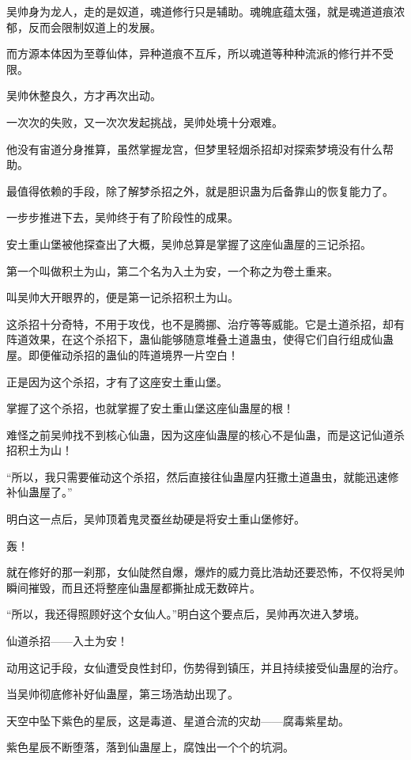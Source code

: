 \begin{this_body}
吴帅身为龙人，走的是奴道，魂道修行只是辅助。魂魄底蕴太强，就是魂道道痕浓郁，反而会限制奴道上的发展。

而方源本体因为至尊仙体，异种道痕不互斥，所以魂道等种种流派的修行并不受限。

吴帅休整良久，方才再次出动。

一次次的失败，又一次次发起挑战，吴帅处境十分艰难。

他没有宙道分身推算，虽然掌握龙宫，但梦里轻烟杀招却对探索梦境没有什么帮助。

最值得依赖的手段，除了解梦杀招之外，就是胆识蛊为后备靠山的恢复能力了。

一步步推进下去，吴帅终于有了阶段性的成果。

安土重山堡被他探查出了大概，吴帅总算是掌握了这座仙蛊屋的三记杀招。

第一个叫做积土为山，第二个名为入土为安，一个称之为卷土重来。

叫吴帅大开眼界的，便是第一记杀招积土为山。

这杀招十分奇特，不用于攻伐，也不是腾挪、治疗等等威能。它是土道杀招，却有阵道效果，在这个杀招下，蛊仙能够随意堆叠土道蛊虫，使得它们自行组成仙蛊屋。即便催动杀招的蛊仙的阵道境界一片空白！

正是因为这个杀招，才有了这座安土重山堡。

掌握了这个杀招，也就掌握了安土重山堡这座仙蛊屋的根！

难怪之前吴帅找不到核心仙蛊，因为这座仙蛊屋的核心不是仙蛊，而是这记仙道杀招积土为山！

“所以，我只需要催动这个杀招，然后直接往仙蛊屋内狂撒土道蛊虫，就能迅速修补仙蛊屋了。”

明白这一点后，吴帅顶着鬼灵蚕丝劫硬是将安土重山堡修好。

轰！

就在修好的那一刹那，女仙陡然自爆，爆炸的威力竟比浩劫还要恐怖，不仅将吴帅瞬间摧毁，而且还将整座仙蛊屋都撕扯成无数碎片。

“所以，我还得照顾好这个女仙人。”明白这个要点后，吴帅再次进入梦境。

仙道杀招——入土为安！

动用这记手段，女仙遭受良性封印，伤势得到镇压，并且持续接受仙蛊屋的治疗。

当吴帅彻底修补好仙蛊屋，第三场浩劫出现了。

天空中坠下紫色的星辰，这是毒道、星道合流的灾劫——腐毒紫星劫。

紫色星辰不断堕落，落到仙蛊屋上，腐蚀出一个个的坑洞。


\end{this_body}

